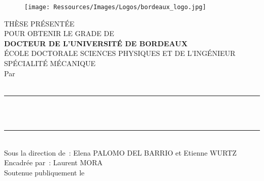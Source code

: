 

\begin{titlepage}
\begin{figure}
    \raggedright
    \texttt{[image: Ressources/Images/Logos/bordeaux\_logo.jpg]}
\end{figure}

\vfill

\begin{center}
    THÈSE PRÉSENTÉE \\
    POUR OBTENIR LE GRADE DE \\[0.8cm]

    \textsc{\Large \textbf{ DOCTEUR DE L'UNIVERSITÉ DE BORDEAUX}}\\[1.5cm] %

    ÉCOLE DOCTORALE SCIENCES PHYSIQUES ET DE L'INGÉNIEUR\\[0.3cm]
    SPÉCIALITÉ MÉCANIQUE\\[1.0cm]
    {\Large Par \myAuthor}\\

    ~\\[0.3cm]
    {\color{SolarizedBrBlue} \rule{\textwidth}{1pt} \vspace{1ex} \filcenter\color{defaultcolor}}
    ~\\[0.01cm]
    {\Large \bfseries \myTitle{}} %
    ~\\[0.2cm]
    {\color{SolarizedBrBlue} \rule{\textwidth}{1pt} \vspace{1ex} \filcenter\color{defaultcolor}}
    ~\\[0.25cm] %

    Sous la direction de~: Elena PALOMO DEL BARRIO et Etienne WURTZ \\
    Encadrée par~: Laurent MORA \\[1.0cm]
    Soutenue publiquement le \myDate
\end{center}

\vfill


\end{titlepage}
